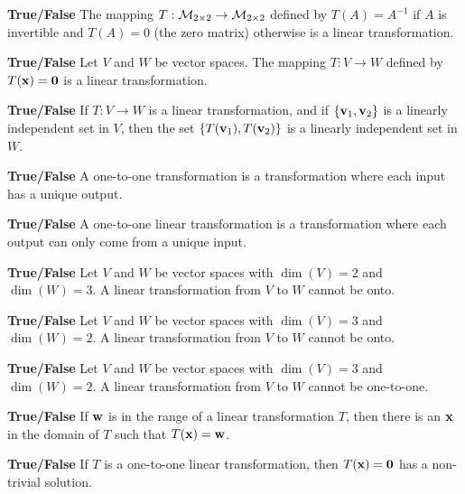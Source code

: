 \item \textbf{True/False} The mapping $T: \mathcal{M}_{2 \times 2} \to \mathcal{M}_{2 \times 2}$ defined by $T(A) = A^{-1}$ if $A$ is invertible and $T(A) = 0$ (the zero matrix) otherwise is a linear transformation. 
	
\item \textbf{True/False}  Let $V$ and $W$ be vector spaces. The mapping $T: V \to W$ defined by $T(\mathbf{x}) = \mathbf{0}$ is a linear transformation. 

\item \textbf{True/False} If $T: V \to W$ is a linear transformation, and if $\{\mathbf{v}_1, \mathbf{v}_2\}$ is a linearly independent set in $V$, then the set $\{T(\mathbf{v}_1), T(\mathbf{v}_2)\}$ is a linearly independent set in $W$.

\item \textbf{True/False} A one-to-one transformation is a transformation where each input has a unique output.

\item \textbf{True/False} A one-to-one linear transformation is a transformation where each output can only come from a unique input.

\item \textbf{True/False} Let $V$ and $W$ be vector spaces with $\dim(V) = 2$ and $\dim(W) = 3$. A linear transformation from $V$ to $W$ cannot be onto.

\item \textbf{True/False} Let $V$ and $W$ be vector spaces with $\dim(V) = 3$ and $\dim(W) = 2$. A linear transformation from $V$ to $W$ cannot be onto.

\item \textbf{True/False} Let $V$ and $W$ be vector spaces with $\dim(V) = 3$ and $\dim(W) = 2$. A linear transformation from $V$ to $W$ cannot be one-to-one.

\item \textbf{True/False} If $\mathbf{w}$ is in the range of a linear transformation $T$, then there is an $\mathbf{x}$ in the domain of $T$ such that $T(\mathbf{x})=\mathbf{w}$.

\item \textbf{True/False} If $T$ is a one-to-one linear transformation, then $T(\mathbf{x})=\mathbf{0}$ has a non-trivial solution.

	\ea
	
\ee


